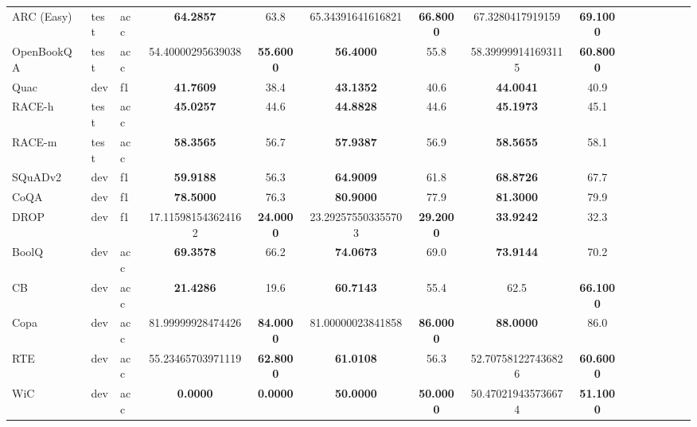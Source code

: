 \documentclass{article}
\theoremstyle{definition}
\begin{document}
\begin{table}
\begin{tabular}{lllSSSSSSSSSSSS}
    ARC (Easy) & test & acc &
    \bfseries 64.2857 & 63.8 &
    65.34391641616821 & \bfseries 66.8000 &
    67.3280417919159 & \bfseries 69.1000 
    \\

    OpenBookQA & test & acc &
    54.40000295639038 & \bfseries 55.6000 &
    \bfseries 56.4000 & 55.8 &
    58.399999141693115 & \bfseries 60.8000 
    \\

    Quac & dev & f1 &
    \bfseries 41.7609 & 38.4 &
    \bfseries 43.1352 & 40.6 &
    \bfseries 44.0041 & 40.9 
    \\

    RACE-h & test & acc &
    \bfseries 45.0257 & 44.6 &
    \bfseries 44.8828 & 44.6 &
    \bfseries 45.1973 & 45.1 
    \\

    RACE-m & test & acc &
    \bfseries 58.3565 & 56.7 &
    \bfseries 57.9387 & 56.9 &
    \bfseries 58.5655 & 58.1 
    \\

    SQuADv2 & dev & f1 &
    \bfseries 59.9188 & 56.3 &
    \bfseries 64.9009 & 61.8 &
    \bfseries 68.8726 & 67.7 
    \\

    CoQA & dev & f1 &
    \bfseries 78.5000 & 76.3 &
    \bfseries 80.9000 & 77.9 &
    \bfseries 81.3000 & 79.9 
    \\

    DROP & dev & f1 &
    17.115981543624162 & \bfseries 24.0000 &
    23.292575503355703 & \bfseries 29.2000 &
    \bfseries 33.9242 & 32.3 
    \\

    BoolQ & dev & acc &
    \bfseries 69.3578 & 66.2 &
    \bfseries 74.0673 & 69.0 &
    \bfseries 73.9144 & 70.2 
    \\

    CB & dev & acc &
    \bfseries 21.4286 & 19.6 &
    \bfseries 60.7143 & 55.4 &
    62.5 & \bfseries 66.1000 
    \\

    Copa & dev & acc &
    81.99999928474426 & \bfseries 84.0000 &
    81.00000023841858 & \bfseries 86.0000 &
    \bfseries 88.0000 & 86.0 
    \\

    RTE & dev & acc &
    55.23465703971119 & \bfseries 62.8000 &
    \bfseries 61.0108 & 56.3 &
    52.707581227436826 & \bfseries 60.6000 
    \\

    WiC & dev & acc &
    \bfseries 0.0000 & \bfseries 0.0000 &
    \bfseries 50.0000 & \bfseries 50.0000 &
    50.470219435736674 & \bfseries 51.1000 
    \\


\end{tabular}
\end{table}
\end{document}
